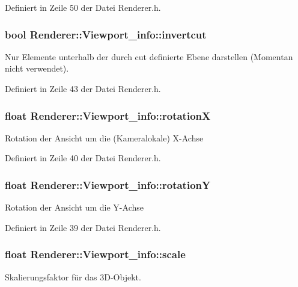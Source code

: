 Definiert in Zeile 50 der Datei Renderer.\-h.

\hypertarget{structRenderer_1_1Viewport__info_a0e06e17e13e9639179de762f6a45c71e}{
\subsubsection[{invertcut}]{\setlength{\rightskip}{0pt plus 5cm}bool Renderer\-::\-Viewport\-\_\-info\-::invertcut}}\label{structRenderer_1_1Viewport__info_a0e06e17e13e9639179de762f6a45c71e}
Nur Elemente unterhalb der durch cut definierte Ebene darstellen (Momentan nicht verwendet). 

Definiert in Zeile 43 der Datei Renderer.\-h.

\hypertarget{structRenderer_1_1Viewport__info_ad8005e4eaa631f4c6b96cf6be05e8428}{
\subsubsection[{rotation\-X}]{\setlength{\rightskip}{0pt plus 5cm}float Renderer\-::\-Viewport\-\_\-info\-::rotation\-X}}\label{structRenderer_1_1Viewport__info_ad8005e4eaa631f4c6b96cf6be05e8428}
Rotation der Ansicht um die (Kameralokale) X-\/\-Achse 

Definiert in Zeile 40 der Datei Renderer.\-h.

\hypertarget{structRenderer_1_1Viewport__info_a80fe2d86956d26105dd8301278e0c4e6}{
\subsubsection[{rotation\-Y}]{\setlength{\rightskip}{0pt plus 5cm}float Renderer\-::\-Viewport\-\_\-info\-::rotation\-Y}}\label{structRenderer_1_1Viewport__info_a80fe2d86956d26105dd8301278e0c4e6}
Rotation der Ansicht um die Y-\/\-Achse 

Definiert in Zeile 39 der Datei Renderer.\-h.

\hypertarget{structRenderer_1_1Viewport__info_a90128db9d24987d94ddd843646a4f03d}{
\subsubsection[{scale}]{\setlength{\rightskip}{0pt plus 5cm}float Renderer\-::\-Viewport\-\_\-info\-::scale}}\label{structRenderer_1_1Viewport__info_a90128db9d24987d94ddd843646a4f03d}
Skalierungsfaktor für das 3\-D-\/\-Objekt. 

